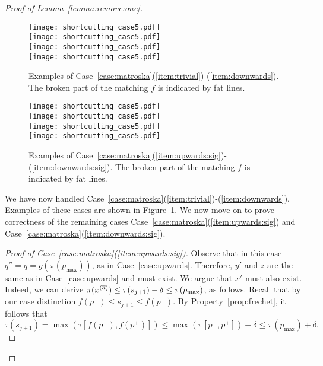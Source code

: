 \documentclass[11pt, letter]{article}
\newcommand{\lemref}[1]{Lemma~\ref{lemma:#1}}
\newcommand{\figlab}[1]{\label{fig:#1}}
\newcommand{\figref}[1]{Figure~\ref{fig:#1}}
\newcommand{\caseref}[1]{Case~\ref{case:#1}}
\newcommand{\propref}[1]{Property~\ref{prop:#1}}
\newcommand{\maxSubC}[4]{\ensuremath{\max( #1[#3,#4])}}
\begin{document}
\begin{proof}[Proof of \lemref{remove:one}]
\begin{figure}\centering
\texttt{[image: shortcutting\_case5.pdf]}\\
\vspace{\baselineskip}
\texttt{[image: shortcutting\_case5.pdf]}\\
\vspace{\baselineskip}
\texttt{[image: shortcutting\_case5.pdf]}\\
\vspace{\baselineskip}
\texttt{[image: shortcutting\_case5.pdf]}\\
\caption{Examples of
\caseref{matroska}(\ref{item:trivial})-(\ref{item:downwards}).  The broken part of the matching
$f$ is indicated by fat lines.}
\figlab{shortcutting:case5i}
\end{figure}

\begin{figure}\centering
\texttt{[image: shortcutting\_case5.pdf]}\\
\vspace{\baselineskip}
\texttt{[image: shortcutting\_case5.pdf]}\\
\vspace{\baselineskip}
\texttt{[image: shortcutting\_case5.pdf]}\\
\vspace{\baselineskip}
\texttt{[image: shortcutting\_case5.pdf]}\\
\caption{Examples of
\caseref{matroska}(\ref{item:upwards:sig})-(\ref{item:downwards:sig}).  The broken part of the matching
$f$ is indicated by fat lines.}
\figlab{shortcutting:case5v}
\end{figure}

We have now handled
\caseref{matroska}(\ref{item:trivial})-(\ref{item:downwards}). Examples of these
cases are shown in \figref{shortcutting:case5i}.
We now move on to prove correctness of the remaining cases 
\caseref{matroska}(\ref{item:upwards:sig}) and \caseref{matroska}(\ref{item:downwards:sig}). 



\begin{proof}[Proof of \caseref{matroska}(\ref{item:upwards:sig})]
Observe that in this case $q''=q=g(\pi(p_{\max}))$, as in \caseref{upwards}.
Therefore, $y'$ and $z$ are the same as in \caseref{upwards} and must exist.
We argue that $x'$ must also exist. Indeed, we can derive 
$\pi(x^{(\overline{a})}) \leq \tau(s_{j+1})-\delta \leq \pi(p_{\max})$,
as follows. Recall that by our case distinction $f(p^{-}) \leq s_{j+1} \leq f(p^{+})$.
By \propref{frechet}, it follows that
\[\tau(s_{j+1}) = \maxSubC{\tau}{t}{f(p^{-})}{f(p^{+})} 
\leq  \maxSubC{\pi}{p}{p^{-}}{p^{+}} +\delta \leq \pi(p_{\max}) +\delta.\]


\end{proof}
\end{proof}
\end{document}
